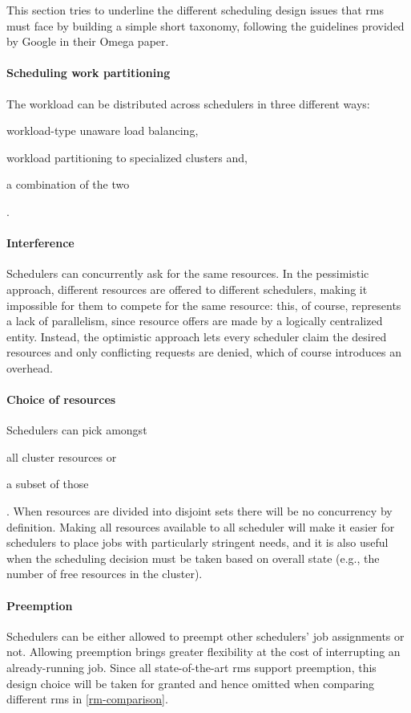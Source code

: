 This section tries to underline the different scheduling design issues that \glspl{rm} must face by building a simple short taxonomy, following the guidelines provided by Google in their Omega \cite{omega} paper.

\paragraph{Scheduling work partitioning}
The workload can be distributed across schedulers in three different ways:
\begin{mylist}
    \item workload-type unaware load balancing,
    \item workload partitioning to specialized clusters and,
    \item a combination of the two
\end{mylist}.

\paragraph{Interference}
Schedulers can concurrently ask for the same resources.
In the pessimistic approach, different resources are offered to different schedulers, making it impossible for them to compete for the same resource: this, of course, represents a lack of parallelism, since resource offers are made by a logically centralized entity.
Instead, the optimistic approach lets every scheduler claim the desired resources and only conflicting requests are denied, which of course introduces an overhead.

\paragraph{Choice of resources}
Schedulers can pick amongst
\begin{mylist}
    \item all cluster resources or 
    \item a subset of those
\end{mylist}.
When resources are divided into disjoint sets there will be no concurrency by definition.
Making all resources available to all scheduler will make it easier for schedulers to place jobs with particularly stringent needs, and it is also useful when the scheduling decision must be taken based on overall state (e.g., the number of free resources in the cluster).

\paragraph{Preemption}
Schedulers can be either allowed to preempt other schedulers' job assignments or not.
Allowing preemption brings greater flexibility at the cost of interrupting an already-running job.
Since all state-of-the-art \glspl{rm} support preemption, this design choice will be taken for granted and hence omitted when comparing different \glspl{rm} in \autoref{rm-comparison}.

